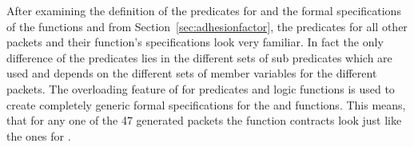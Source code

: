 After examining the definition of the predicates for 
and the formal specifications of the functions 
and  from Section~\ref{sec:adhesionfactor},
the predicates for all other packets and their function's specifications
look very familiar.
In fact the only difference of the predicates lies in the different
sets of sub predicates which are used and depends on the different sets
of member variables for the different packets.
The overloading feature of \acsl for predicates and logic functions
is used to create completely generic formal specifications for the
 and  functions.
This means, that for any one of the 47 generated packets the
function contracts look just like the ones for .

